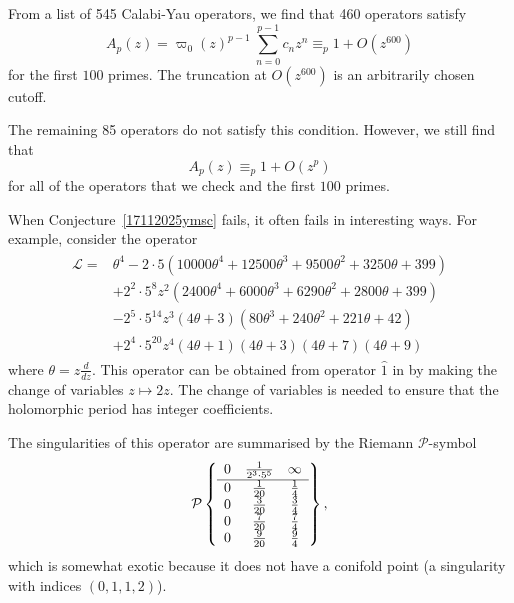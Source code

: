 \documentclass[11pt,leqno]{article}
\theoremstyle{remark}
\theoremstyle{definition}
\begin{document}
From a list of 545 Calabi-Yau operators, we find that 460 operators satisfy
\begin{equation*}
    A_p(z) =\varpi_0(z)^{p-1}~\sum_{n=0}^{p-1}c_nz^n    \equiv_p1 +O(z^{600})
\end{equation*}
for the first $100$ primes. The truncation at $O(z^{600})$ is an arbitrarily chosen cutoff.

The remaining 85 operators do not satisfy this condition. %
However, we still find that
\begin{equation*}
    A_p(z) \equiv_p1 +O(z^{p})
\end{equation*}
for all of the operators that we check and the first $100$ primes.



When Conjecture~\ref{17112025ymsc} fails, it often fails in interesting ways. For example, consider the operator 
\begin{align*}
\label{eq: AESZ 1hat after change of variables}
    \begin{split}
        \mathcal{L}=&\theta^4-2\cdot 5(10000\theta^4 + 12500\theta^3 + 9500\theta^2 + 3250\theta + 399)\\
        &+2^2\cdot5^8z^2(2400\theta^4 + 6000\theta^3 + 6290\theta^2 + 2800\theta + 399)\\
        &-2^5\cdot 5^{14}z^3(4\theta + 3)(80\theta^3 + 240\theta^2 + 221\theta + 42)\\
        &+2^4\cdot5^{20}z^4(4\theta + 1)(4\theta + 3)(4\theta + 7)(4\theta + 9)
    \end{split}
\end{align*}
where $\theta=z\frac{d}{dz}$. This operator can be obtained from operator $\widehat{1}$ in \cite{alenstzu} by making the change of variables $z\mapsto 2z$. The change of variables is needed to ensure that the holomorphic period has integer coefficients.

The singularities of this operator are summarised by the Riemann $\mathcal{P}$-symbol
\begin{equation*}
    \mathcal{P}\left\{\begin{array}{c c c} 0 & \frac{1}{2^3\cdot 5^5} & \infty\\[1pt]
    \hline
    0 & \frac{1}{20} & \frac{1}{4}\\
    0 & \frac{3}{20} & \frac{3}{4}\\
    0 & \frac{7}{20} & \frac{7}{4}\\
    0 & \frac{9}{20} & \frac{9}{4}\\
    \end{array}\right\},
\end{equation*}
which is somewhat exotic because it does not have a conifold point (a singularity with indices $(0,1,1,2)$).
\end{document}

